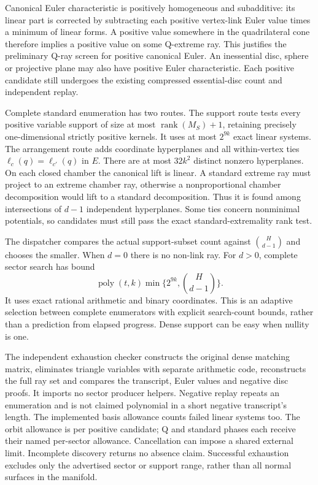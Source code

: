 Canonical Euler characteristic is positively homogeneous and subadditive:
its linear part is corrected by subtracting each positive vertex-link Euler
value times a minimum of linear forms. A positive value somewhere in the
quadrilateral cone therefore implies a positive value on some Q-extreme ray.
This justifies the preliminary Q-ray screen for positive canonical Euler.
An inessential disc, sphere or projective plane may also have positive
Euler characteristic. Each positive candidate still undergoes the existing
compressed essential-disc count and independent replay.

Complete standard enumeration has two routes. The support route tests every
positive variable support of size at most $\operatorname{rank}(M_S)+1$,
retaining precisely one-dimensional strictly positive kernels. It uses
at most $2^{9k}$ exact linear systems. The arrangement route adds coordinate
hyperplanes and all within-vertex ties $\ell_c(q)=\ell_{c'}(q)$ in $E$.
There are at most $32k^2$ distinct nonzero hyperplanes. On each closed
chamber the canonical lift is linear. A standard extreme ray must project
to an extreme chamber ray, otherwise a nonproportional chamber decomposition
would lift to a standard decomposition. Thus it is found among intersections
of $d-1$ independent hyperplanes. Some ties concern nonminimal potentials,
so candidates must still pass the exact standard-extremality rank test.

The dispatcher compares the actual support-subset count against
$\binom H{d-1}$ and chooses the smaller. When $d=0$ there is no non-link
ray. For $d>0$, complete sector search has bound
\[
 \operatorname{poly}(t,k)\min\{2^{9k},\binom H{d-1}\}.
\]
It uses exact rational arithmetic and binary coordinates. This is an
adaptive selection between complete enumerators with explicit search-count
bounds, rather than a prediction from elapsed progress. Dense support can
be easy when nullity is one.

The independent exhaustion checker constructs the original dense matching
matrix, eliminates triangle variables with separate arithmetic code,
reconstructs the full ray set and compares the transcript, Euler values
and negative disc proofs. It imports no sector producer helpers. Negative
replay repeats an enumeration and is not claimed polynomial in a short
negative transcript's length. The implemented basis allowance counts failed
linear systems too. The orbit allowance is per positive candidate; Q and
standard phases each receive their named per-sector allowance. Cancellation
can impose a shared external limit. Incomplete discovery returns no absence
claim. Successful exhaustion excludes only the advertised sector or support
range, rather than all normal surfaces in the manifold.

